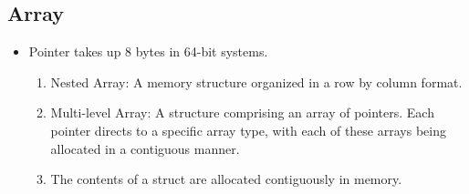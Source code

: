 \documentclass[11pt,reqno]{amsart}
\theoremstyle{remark}
\begin{document}
\subsection*{Array}
\begin{itemize}
\item Pointer takes up 8 bytes in 64-bit systems.
\begin{enumerate}
\item Nested Array: A memory structure organized in a row by column format.
\item Multi-level Array: A structure comprising an array of pointers. Each pointer directs to a specific array 
type, with each of these arrays being allocated in a contiguous manner.
\item The contents of a struct are allocated contiguously in memory.
\end{enumerate}
\end{itemize}
\end{document}

